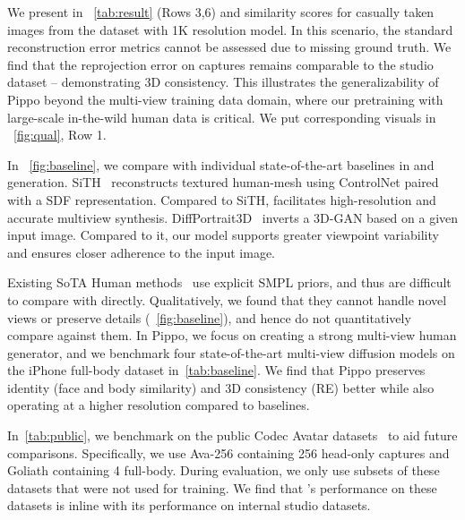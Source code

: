 \vspace{1mm}
 \noindent We present in ~\cref{tab:result} (Rows 3,6) \reprojectionerror and similarity scores for casually taken images from the \mobile dataset with 1K resolution model. In this scenario, the standard reconstruction error metrics cannot be assessed due to missing ground truth. We find that the reprojection error on \mobile captures remains comparable to the studio dataset -- demonstrating 3D consistency. This illustrates the generalizability of Pippo beyond the multi-view training data domain, where our pretraining with large-scale in-the-wild human data is critical.
We put corresponding visuals in ~\cref{fig:qual}, Row 1.




 In ~\cref{fig:baseline}, we compare \ourmodel with individual state-of-the-art baselines in \fullbody and \upperbody generation. SiTH~\cite{ho2024sith} reconstructs textured human-mesh using ControlNet paired with a SDF representation. Compared to SiTH, \ourmodel facilitates high-resolution and accurate multiview synthesis. DiffPortrait3D~\cite{gu2024diffportrait3d} inverts a 3D-GAN based on a given input image. Compared to it, our model supports greater viewpoint variability and ensures closer adherence to the input image.

 Existing SoTA Human methods~\cite{ho2024sith, gu2024diffportrait3d} use explicit SMPL priors, and thus are difficult to compare with directly. Qualitatively, we found that they cannot handle novel views or preserve details (~\cref{fig:baseline}), and hence do not quantitatively compare against them. 
\noindent In Pippo, we focus on creating a strong multi-view human generator, and we benchmark four state-of-the-art multi-view diffusion models on the {iPhone full-body dataset} in~\cref{tab:baseline}. We find that Pippo preserves identity (\ie face and body similarity) and 3D consistency (RE) better while also operating at a higher resolution compared to baselines.



 In~\cref{tab:public}, we benchmark \ourmodel on the public Codec Avatar datasets~\cite{martinez2024codec} to aid future comparisons. Specifically, we use Ava-256 containing 256 head-only captures and Goliath containing 4 full-body. During evaluation, we only use subsets of these datasets that were not used for training. We find that \ourmodel's performance on these datasets is inline with its performance on internal studio datasets. 

